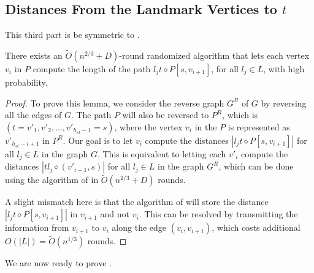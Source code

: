 \subsection{Distances From the Landmark Vertices to \texorpdfstring{$t$}{t}}\label{land to t}

This third part is be symmetric to . %


\begin{lemma}[Part 2]
\label{lem : land to t}
    There exists an $\widetilde{O}(n^{2/3}+D)$-round randomized algorithm that lets each vertex $v_i$ in $P$ compute the length of the path $l_jt \diamond P[s,v_{i+1}]$, for all $l_j \in L$, with high probability.
\end{lemma}

\begin{proof}
    To prove this lemma, we consider the reverse graph $G^R$ of $G$ by reversing all the edges of $G$. The path $P$ will also be reversed to $P^R$, which is $(t=v'_1,v'_2, \dots , v'_{h_{st}-1}=s)$, where the vertex $v_i$ in the $P$ is represented as $v'_{h_{st}-i+1}$ in $P^R$. Our goal is to let $v_i$ compute the distances $|l_jt \diamond P[s,v_{i+1}]|$ for all $l_j \in L$ in the graph $G$. This is equivalent to letting each $v'_i$ compute the distances $|tl_j \diamond (v'_{i-1},s)|$  for all $l_j \in L$ in the graph $G^R$, which can be done using the algorithm of  in  $\widetilde{O}(n^{2/3}+D)$ rounds. 
    
    A slight mismatch here is that the algorithm of  will store the distance $|l_jt \diamond P[s,v_{i+1}]|$ in $v_{i+1}$ and not $v_i$. This can be resolved by transmitting the information from $v_{i+1}$ to $v_i$ along the edge $(v_i, v_{i+1})$, which costs additional $O(|L|)=\widetilde{O}(n^{1/3})$ rounds.
\end{proof}

We are now ready to prove .

